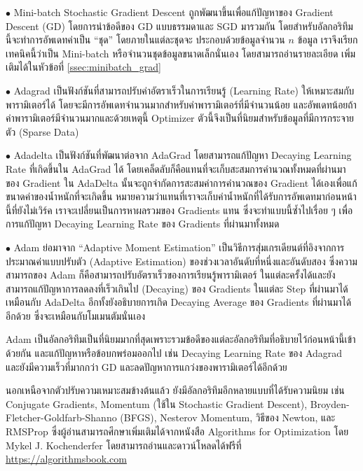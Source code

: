 \noindent $\bullet$ Mini-batch Stochastic Gradient Descent ถูกพัฒนาขึ้นเพื่อแก้ปัญหาของ Gradient Descent (GD) 
โดยการนำข้อดีของ GD แบบธรรมดาและ SGD มารวมกัน โดยสำหรับอัลกอริทึมนี้จะทำการอัพเดทค่าเป็น \enquote{ชุด} โดยภายในแต่ละชุดจะ%
ประกอบด้วยข้อมูลจำนวน $n$ ข้อมูล เราจึงเรียกเทคนิคนี้ว่าเป็น Mini-batch หรือจำนวนชุดข้อมูลขนาดเล็กนั่นเอง โดยสามารถอ่านรายละเอียด%
เพิ่มเติมได้ในหัวข้อที่ \ref{ssec:minibatch_grad}

\noindent $\bullet$ Adagrad เป็นฟังก์ชันที่สามารถปรับค่าอัตราเร็วในการเรียนรู้ (Learning Rate) ให้เหมาะสมกับพารามิเตอร์ได้ 
โดยจะมีการอัพเดทจำนวนมากสำหรับค่าพารามิเตอร์ที่มีจำนวนน้อย และอัพเดทน้อยถ้าค่าพารามิเตอร์มีจำนวนมากและด้วยเหตุนี้ Optimizer 
ตัวนี้จึงเป็นที่นิยมสำหรับข้อมูลที่มีการกระจายตัว (Sparse Data)

\noindent $\bullet$ Adadelta เป็นฟังก์ชันที่พัฒนาต่อจาก AdaGrad โดยสามารถแก้ปัญหา Decaying Learning Rate ที่เกิดขึ้นใน 
AdaGrad ได้ โดยเคล็ดลับก็คือแทนที่จะเก็บสะสมการคำนวณทั้งหมดที่ผ่านมาของ Gradient ใน AdaDelta นั้นจะถูกจำกัดการสะสมค่าการคำนวณของ 
Gradient ได้เองเพื่อแก้ขนาดค่าของน้ำหนักที่จะเกิดขึ้น หมายความว่าแทนที่เราจะเก็บค่าน้ำหนักที่ได้รับการอัพเดทมาก่อนหน้านี้ที่ยังไม่เวิร์ค 
เราจะเปลี่ยนเป็นการหาผลรวมของ Gradients แทน ซึ่งจะทำแบบนี้ซ้ำไปเรื่อย ๆ เพื่อการแก้ปัญหา Decaying Learning Rate ของ Gradients 
ที่ผ่านมาทั้งหมด

\noindent $\bullet$ Adam ย่อมาจาก \enquote{Adaptive Moment Estimation} เป็นวิธีการสุ่มเกรเดียนต์ที่อิงจากการประมาณค่าแบบปรับตัว 
(Adaptive Estimation) ของช่วงเวลาอันดับที่หนึ่งและอันดับสอง ซึ่งความสามารถของ Adam ก็คือสามารถปรับอัตราเร็วของการเรียนรู้พารามิเตอร์%
ในแต่ละครั้งได้และยังสามารถแก้ปัญหาการลดลงที่เร็วเกินไป (Decaying) ของ Gradients ในแต่ละ Step ที่ผ่านมาได้เหมือนกับ AdaDelta 
อีกทั้งยังอธิบายการเกิด Decaying Average ของ Gradients ที่ผ่านมาได้อีกด้วย ซึ่งจะเหมือนกับโมเมนตัมนั่นเอง

Adam เป็นอัลกอริทึมเป็นที่นิยมมากที่สุดเพราะรวมข้อดีของแต่ละอัลกอริทึมที่อธิบายไว้ก่อนหน้านี้เข้าด้วยกัน และแก้ปัญหาหรือข้อบกพร่อมออกไป 
เช่น Decaying Learning Rate ของ Adagrad และยังมีความเร็วที่มากกว่า GD และลดปัญหาการแกว่งของพารามิเตอร์ได้อีกด้วย

นอกเหนือจากตัวปรับความเหมาะสมข้างต้นแล้ว ยังมีอัลกอริทึมอีกหลายแบบที่ได้รับความนิยม เช่น Conjugate Gradients, Momentum (ใช้ใน
Stochastic Gradient Descent), Broyden-Fletcher-Goldfarb-Shanno (BFGS), Nesterov Momentum, วิธีของ Newton, และ
RMSProp ซึ่งผู้อ่านสามารถศึกษาเพิ่มเติมได้จากหนังสือ Algorithms for Optimization\autocite{kochenderfer2019} โดย Mykel J. 
Kochenderfer โดยสามารถอ่านและดาวน์โหลดได้ฟรีที่ \url{https://algorithmsbook.com}

